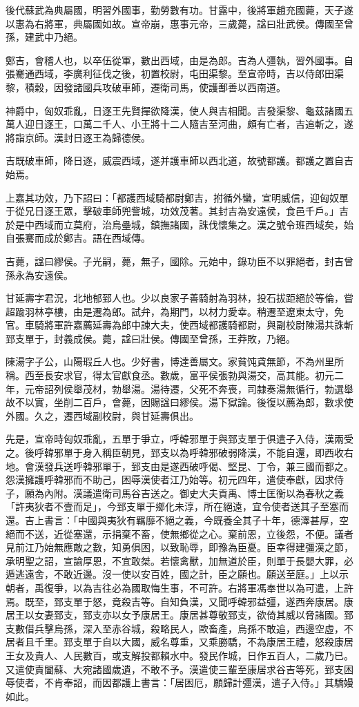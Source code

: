 \begin{pinyinscope}
後代蘇武為典屬國，明習外國事，勤勞數有功。甘露中，後將軍趙充國薨，天子遂以惠為右將軍，典屬國如故。宣帝崩，惠事元帝，三歲薨，諡曰壯武侯。傳國至曾孫，建武中乃絕。

鄭吉，會稽人也，以卒伍從軍，數出西域，由是為郎。吉為人彊執，習外國事。自張騫通西域，李廣利征伐之後，初置校尉，屯田渠黎。至宣帝時，吉以侍郎田渠黎，積穀，因發諸國兵攻破車師，遷衛司馬，使護鄯善以西南道。

神爵中，匈奴乖亂，日逐王先賢撣欲降漢，使人與吉相聞。吉發渠黎、龜茲諸國五萬人迎日逐王，口萬二千人、小王將十二人隨吉至河曲，頗有亡者，吉追斬之，遂將詣京師。漢封日逐王為歸德侯。

吉既破車師，降日逐，威震西域，遂并護車師以西北道，故號都護。都護之置自吉始焉。

上嘉其功效，乃下詔曰：「都護西域騎都尉鄭吉，拊循外蠻，宣明威信，迎匈奴單于從兄日逐王眾，擊破車師兜訾城，功效茂著。其封吉為安遠侯，食邑千戶。」吉於是中西域而立莫府，治烏壘城，鎮撫諸國，誅伐懷集之。漢之號令班西域矣，始自張騫而成於鄭吉。語在西域傳。

吉薨，諡曰繆侯。子光嗣，薨，無子，國除。元始中，錄功臣不以罪絕者，封吉曾孫永為安遠侯。

甘延壽字君況，北地郁郅人也。少以良家子善騎射為羽林，投石拔距絕於等倫，嘗超踰羽林亭樓，由是遷為郎。試弁，為期門，以材力愛幸。稍遷至遼東太守，免官。車騎將軍許嘉薦延壽為郎中諫大夫，使西域都護騎都尉，與副校尉陳湯共誅斬郅支單于，封義成侯。薨，諡曰壯侯。傳國至曾孫，王莽敗，乃絕。

陳湯字子公，山陽瑕丘人也。少好書，博達善屬文。家貧饨貣無節，不為州里所稱。西至長安求官，得太官獻食丞。數歲，富平侯張勃與湯交，高其能。初元二年，元帝詔列侯舉茂材，勃舉湯。湯待遷，父死不奔喪，司隸奏湯無循行，勃選舉故不以實，坐削二百戶，會薨，因賜諡曰繆侯。湯下獄論。後復以薦為郎，數求使外國。久之，遷西域副校尉，與甘延壽俱出。

先是，宣帝時匈奴乖亂，五單于爭立，呼韓邪單于與郅支單于俱遣子入侍，漢兩受之。後呼韓邪單于身入稱臣朝見，郅支以為呼韓邪破弱降漢，不能自還，即西收右地。會漢發兵送呼韓邪單于，郅支由是遂西破呼偈、堅昆、丁令，兼三國而都之。怨漢擁護呼韓邪而不助己，困辱漢使者江乃始等。初元四年，遣使奉獻，因求侍子，願為內附。漢議遣衛司馬谷吉送之。御史大夫貢禹、博士匡衡以為春秋之義「許夷狄者不壹而足」，今郅支單于鄉化未淳，所在絕遠，宜令使者送其子至塞而還。吉上書言：「中國與夷狄有羈靡不絕之義，今既養全其子十年，德澤甚厚，空絕而不送，近從塞還，示捐棄不畜，使無鄉從之心。棄前恩，立後怨，不便。議者見前江乃始無應敵之數，知勇俱困，以致恥辱，即豫為臣憂。臣幸得建彊漢之節，承明聖之詔，宣諭厚恩，不宜敢桀。若懷禽獸，加無道於臣，則單于長嬰大罪，必遁逃遠舍，不敢近邊。沒一使以安百姓，國之計，臣之願也。願送至庭。」上以示朝者，禹復爭，以為吉往必為國取悔生事，不可許。右將軍馮奉世以為可遣，上許焉。既至，郅支單于怒，竟殺吉等。自知負漢，又聞呼韓邪益彊，遂西奔康居。康居王以女妻郅支，郅支亦以女予康居王。康居甚尊敬郅支，欲倚其威以脅諸國。郅支數借兵擊烏孫，深入至赤谷城，殺略民人，歐畜產，烏孫不敢追，西邊空虛，不居者且千里。郅支單于自以大國，威名尊重，又乘勝驕，不為康居王禮，怒殺康居王女及貴人、人民數百，或支解投都賴水中。發民作城，日作五百人，二歲乃已。又遣使責闔蘇、大宛諸國歲遺，不敢不予。漢遣使三輩至康居求谷吉等死，郅支困辱使者，不肯奉詔，而因都護上書言：「居困厄，願歸計彊漢，遣子入侍。」其驕嫚如此。


\end{pinyinscope}

